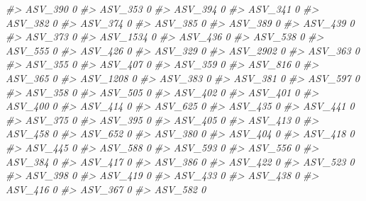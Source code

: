 \documentclass[
]{article}
\newenvironment{Shaded}{\begin{snugshade}}{\end{snugshade}}
\newcommand{\CommentTok}[1]{\textcolor[rgb]{0.56,0.35,0.01}{\textit{#1}}}
\begin{document}
\begin{Shaded}
\begin{Highlighting}[]
\CommentTok{\#\textgreater{} ASV\_390   0}
\CommentTok{\#\textgreater{} ASV\_353   0}
\CommentTok{\#\textgreater{} ASV\_394   0}
\CommentTok{\#\textgreater{} ASV\_341   0}
\CommentTok{\#\textgreater{} ASV\_382   0}
\CommentTok{\#\textgreater{} ASV\_374   0}
\CommentTok{\#\textgreater{} ASV\_385   0}
\CommentTok{\#\textgreater{} ASV\_389   0}
\CommentTok{\#\textgreater{} ASV\_439   0}
\CommentTok{\#\textgreater{} ASV\_373   0}
\CommentTok{\#\textgreater{} ASV\_1534  0}
\CommentTok{\#\textgreater{} ASV\_436   0}
\CommentTok{\#\textgreater{} ASV\_538   0}
\CommentTok{\#\textgreater{} ASV\_555   0}
\CommentTok{\#\textgreater{} ASV\_426   0}
\CommentTok{\#\textgreater{} ASV\_329   0}
\CommentTok{\#\textgreater{} ASV\_2902  0}
\CommentTok{\#\textgreater{} ASV\_363   0}
\CommentTok{\#\textgreater{} ASV\_355   0}
\CommentTok{\#\textgreater{} ASV\_407   0}
\CommentTok{\#\textgreater{} ASV\_359   0}
\CommentTok{\#\textgreater{} ASV\_816   0}
\CommentTok{\#\textgreater{} ASV\_365   0}
\CommentTok{\#\textgreater{} ASV\_1208  0}
\CommentTok{\#\textgreater{} ASV\_383   0}
\CommentTok{\#\textgreater{} ASV\_381   0}
\CommentTok{\#\textgreater{} ASV\_597   0}
\CommentTok{\#\textgreater{} ASV\_358   0}
\CommentTok{\#\textgreater{} ASV\_505   0}
\CommentTok{\#\textgreater{} ASV\_402   0}
\CommentTok{\#\textgreater{} ASV\_401   0}
\CommentTok{\#\textgreater{} ASV\_400   0}
\CommentTok{\#\textgreater{} ASV\_414   0}
\CommentTok{\#\textgreater{} ASV\_625   0}
\CommentTok{\#\textgreater{} ASV\_435   0}
\CommentTok{\#\textgreater{} ASV\_441   0}
\CommentTok{\#\textgreater{} ASV\_375   0}
\CommentTok{\#\textgreater{} ASV\_395   0}
\CommentTok{\#\textgreater{} ASV\_405   0}
\CommentTok{\#\textgreater{} ASV\_413   0}
\CommentTok{\#\textgreater{} ASV\_458   0}
\CommentTok{\#\textgreater{} ASV\_652   0}
\CommentTok{\#\textgreater{} ASV\_380   0}
\CommentTok{\#\textgreater{} ASV\_404   0}
\CommentTok{\#\textgreater{} ASV\_418   0}
\CommentTok{\#\textgreater{} ASV\_445   0}
\CommentTok{\#\textgreater{} ASV\_588   0}
\CommentTok{\#\textgreater{} ASV\_593   0}
\CommentTok{\#\textgreater{} ASV\_556   0}
\CommentTok{\#\textgreater{} ASV\_384   0}
\CommentTok{\#\textgreater{} ASV\_417   0}
\CommentTok{\#\textgreater{} ASV\_386   0}
\CommentTok{\#\textgreater{} ASV\_422   0}
\CommentTok{\#\textgreater{} ASV\_523   0}
\CommentTok{\#\textgreater{} ASV\_398   0}
\CommentTok{\#\textgreater{} ASV\_419   0}
\CommentTok{\#\textgreater{} ASV\_433   0}
\CommentTok{\#\textgreater{} ASV\_438   0}
\CommentTok{\#\textgreater{} ASV\_416   0}
\CommentTok{\#\textgreater{} ASV\_367   0}
\CommentTok{\#\textgreater{} ASV\_582   0}

\end{Highlighting}
\end{Shaded}
\end{document}
